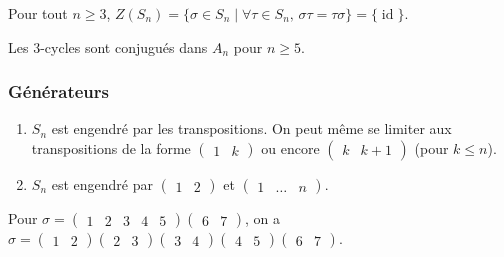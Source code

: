 
  \begin{proposition}
    Pour tout $n \geq 3$, $Z(S_n) = \{ \sigma \in S_n \mid \forall \tau \in S_n, \, \sigma \tau = \tau \sigma \} = \{ \operatorname{id} \}$.
  \end{proposition}


  \begin{lemma}
    Les $3$-cycles sont conjugués dans $A_n$ pour $n \geq 5$.
  \end{lemma}

  \subsubsection{Générateurs}


  \begin{proposition}
    \begin{enumerate}[label={\bfseries(\roman*)}]
      \item $S_n$ est engendré par les transpositions. On peut même se limiter aux transpositions de la forme $\begin{pmatrix} 1 & k \end{pmatrix}$ ou encore  $\begin{pmatrix} k & k+1 \end{pmatrix}$ (pour $k \leq n$).
      \item $S_n$ est engendré par $\begin{pmatrix} 1 & 2 \end{pmatrix}$ et $\begin{pmatrix} 1 & \dots & n \end{pmatrix}$.
    \end{enumerate}
  \end{proposition}

  \begin{example}
    Pour $\sigma = \begin{pmatrix} 1 & 2 & 3 & 4 & 5 \end{pmatrix}\begin{pmatrix} 6 & 7 \end{pmatrix}$, on a $\sigma = \begin{pmatrix} 1 & 2 \end{pmatrix} \begin{pmatrix} 2 & 3 \end{pmatrix} \begin{pmatrix} 3 & 4 \end{pmatrix} \begin{pmatrix} 4 & 5 \end{pmatrix} \begin{pmatrix} 6 & 7 \end{pmatrix}$.
  \end{example}

